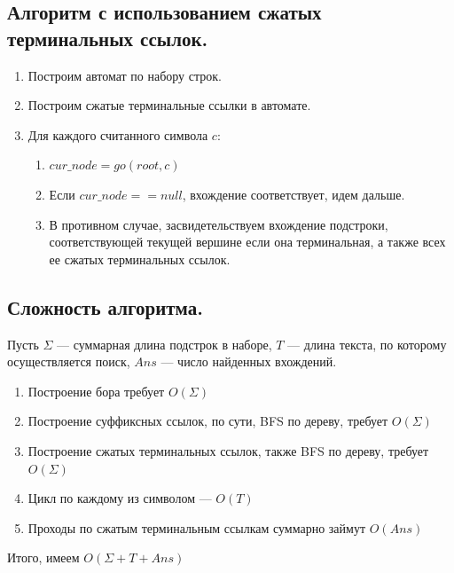 \subsection{Алгоритм с использованием сжатых терминальных ссылок.}
\begin{enumerate}
    \item Построим автомат по набору строк.
    \item Построим сжатые терминальные ссылки в автомате.
    \item Для каждого считанного символа $c$:
        \begin{enumerate}
            \item $cur\_node = go(root, c)$
            \item Если $cur\_node == null$, вхождение соответствует, идем дальше.
            \item В противном случае, засвидетельствуем вхождение подстроки, соответствующей текущей вершине если она терминальная, а также всех ее сжатых терминальных ссылок.
        \end{enumerate}
\end{enumerate}

\subsection{Сложность алгоритма.}
Пусть $\Sigma$ --- суммарная длина подстрок в наборе,  $T$ --- длина текста, по которому осуществляется поиск, $Ans$ --- число найденных вхождений.

\begin{enumerate}
    \item Построение бора требует $O(\Sigma)$
    \item Построение суффиксных ссылок, по сути, BFS по дереву, требует  $O(\Sigma)$
    \item Построение сжатых терминальных ссылок, также BFS по дереву, требует $O(\Sigma)$
    \item Цикл по каждому из символом --- $O(T)$
    \item Проходы по сжатым терминальным ссылкам суммарно займут  $O(Ans)$
\end{enumerate}

Итого, имеем $O(\Sigma + T + Ans)$
